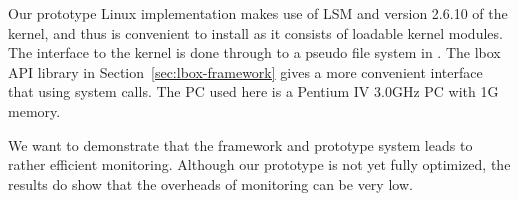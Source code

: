 Our prototype Linux implementation makes use of LSM \cite{wright2002linux} and
version 2.6.10 of the kernel,
and thus is convenient to install
as it consists of loadable kernel modules.
The interface to the kernel is done through  to a pseudo file system
in .
The lbox API library in Section~\ref{sec:lbox-framework} 
gives a more convenient interface that using  system calls.
The PC used here is a Pentium IV 3.0GHz PC with 1G memory.

We want to demonstrate that the framework and prototype system leads
to rather efficient monitoring. Although our prototype is not yet
fully optimized, the results do show that the overheads of monitoring
can be very low.

